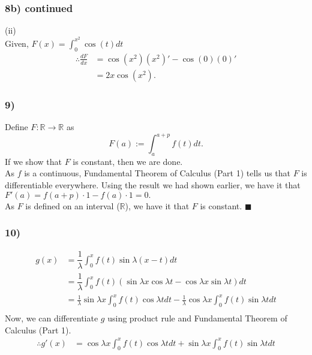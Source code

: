 \documentclass[handout]{beamer}
\begin{document}
\begin{frame}
	\frametitle{8b) continued}
	(ii)\\
	Given, $F(x) = \displaystyle\int_{0}^{x^2} \cos(t) dt $
	\begin{align*}
		\therefore \frac{dF}{dx} & = \cos\left(x^2\right)(x^2)' - \cos(0)(0)' \\
		                         & = 2x\cos(x^2).
	\end{align*}
\end{frame}
\begin{frame}
	\frametitle{9)}
	Define $F:\mathbb{R} \to \mathbb{R}$ as
	\[F(a) := \int_{a}^{a+p} f(t) dt.\]
	If we show that $F$ is constant, then we are done.\\
	As $f$ is a continuous, Fundamental Theorem of Calculus (Part 1) tells us that $F$ is differentiable everywhere. Using the result we had shown earlier, we have it that $F'(a) = f(a+p)\cdot 1 - f(a)\cdot 1 = 0.$\\
	As $F$ is defined on an interval ($\mathbb{R}$), we have it that $F$ is constant. \hfill $\blacksquare$
\end{frame}

\begin{frame}
	\frametitle{10)}
	\begin{align*}
		g(x) & = \dfrac{1}{\lambda}\int_{0}^{x} f(t)\sin \lambda(x - t) dt                                                                             \\
		     & = \dfrac{1}{\lambda}\int_{0}^{x} f(t) \left(\sin \lambda x\cos \lambda t - \cos \lambda x \sin \lambda t\right) dt                      \\
		     & = \frac{1}{\lambda}\sin\lambda x\int_{0}^{x} f(t)\cos \lambda t dt - \frac{1}{\lambda}\cos \lambda x \int_{0}^{x} f(t)\sin \lambda t dt \\
	\end{align*}
	Now, we can differentiate $g$ using product rule and Fundamental Theorem of Calculus (Part 1).
	\begin{align*}
		\therefore g'(x) %
		 & = \cos\lambda x\int_{0}^{x} f(t)\cos \lambda t dt + \sin \lambda x \int_{0}^{x} f(t)\sin \lambda t dt \\
	\end{align*}
\end{frame}
\end{document}
